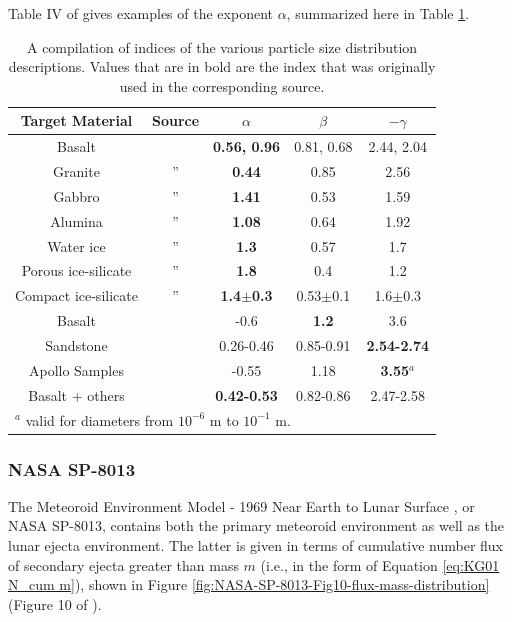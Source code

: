 \documentclass{article}
\begin{document}
Table IV of \citep{koschny2001impacts_mass} gives examples of the exponent $\alpha$, summarized here in Table \ref{tab:mass-diameter_index_examples}.

\begin{table}[!htb]
	\begin{center}
	\caption{A compilation of indices of the various particle size distribution descriptions. Values that are in bold are the index that was originally used in the corresponding source.}\label{tab:mass-diameter_index_examples}
	\begin{tabular}{|c | c | c | c | c|}\hline
		\textbf{Target Material} & \textbf{Source} & $\alpha$ & $\beta$ & $-\gamma$ \\\hline
		Basalt	& \cite{koschny2001impacts_mass}	& \textbf{0.56, 0.96} & 0.81, 0.68 & 2.44, 2.04\\\hline
		Granite	& ''	&\textbf{ 0.44} & 0.85 & 2.56\\\hline
		Gabbro	& ''	& \textbf{1.41} & 0.53 & 1.59\\\hline
		Alumina	& ''	& \textbf{1.08} & 0.64 & 1.92\\\hline
		Water ice	& ''	& \textbf{1.3} & 0.57 & 1.7\\\hline
		Porous ice-silicate	& ''	& \textbf{1.8} & 0.4 & 1.2\\\hline
		Compact ice-silicate	& ''	& \textbf{1.4$\pm$0.3} & 0.53$\pm$0.1 & 1.6$\pm$0.3\\\hline
		Basalt & \cite{cour1969meteoroid} & -0.6 & \textbf{1.2} & 3.6\\\hline
		Sandstone & \cite{buhl2014ejecta} & 0.26-0.46 & 0.85-0.91 & \textbf{2.54-2.74} \\\hline
		Apollo Samples & \cite{carrier2003particle} & -0.55 & 1.18 & \textbf{3.55}$^a$ \\\hline
		Basalt + others & \cite{oKeefe1985impact} & \textbf{0.42-0.53} & 0.82-0.86 & 2.47-2.58 \\\hline
		\multicolumn{5}{l}{\footnotesize $^a$ valid for diameters from $10^{-6}$ m to $10^{-1}$ m.}
	\end{tabular}
\end{center}
\end{table}


\subsubsection{NASA SP-8013}
The Meteoroid Environment Model - 1969 Near Earth to Lunar Surface \citep{cour1969meteoroid}, or NASA SP-8013, contains both the primary meteoroid environment as well as the lunar ejecta environment. The latter is given in terms of cumulative number flux of secondary ejecta greater than mass $m$ (i.e., in the form of Equation \eqref{eq:KG01 N_cum m}), shown in Figure \ref{fig:NASA-SP-8013-Fig10-flux-mass-distribution} (Figure 10 of \cite{cour1969meteoroid}).
\end{document}
